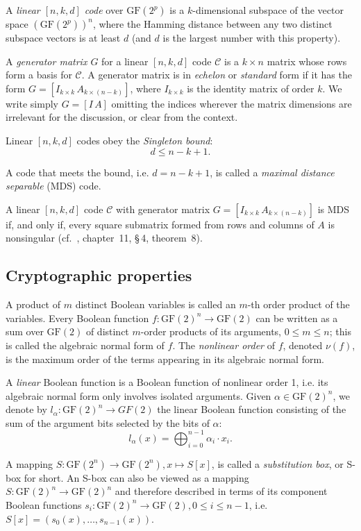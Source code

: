 \documentclass{llncs}
\newcommand{\GF}{\mathrm{GF}}
\begin{document}
A \emph{linear $[n, k, d]$ code} over $\GF(2^p)$ is a
$k$-dimensional subspace of the vector space $(\GF(2^p))^n$,
where the Hamming distance between any two distinct subspace
vectors is at least $d$ (and $d$ is the largest number with this
property).

A \emph{generator matrix $G$} for a linear $[n, k, d]$ code
$\mathcal{C}$ is a $k \times n$ matrix whose rows form a basis for
$\mathcal{C}$. A generator matrix is in \emph{echelon} or
\emph{standard} form if it has the form $G = [I_{k \times k} \,
A_{k \times (n-k)}]$, where $I_{k \times k}$ is the identity
matrix of order $k$. We write simply $G = [I \, A]$ omitting the
indices wherever the matrix dimensions are irrelevant for the
discussion, or clear from the context.

Linear $[n,k,d]$ codes obey the {\em Singleton bound}:
\[
d \leqslant n - k + 1.
\]

A code that meets the bound, i.e. $d = n - k + 1$, is called a
\emph{maximal distance separable} (MDS) code.

A linear $[n, k, d]$ code $\mathcal{C}$ with generator matrix $G
= [I_{k \times k} \, A_{k \times (n-k)}]$ is MDS if, and only if,
every square submatrix formed from rows and columns of $A$ is
nonsingular (cf.~\cite{macwilliams-sloane}, chapter~11, \S\,4,
theorem~8).

\subsection{Cryptographic properties}

A product of $m$ distinct Boolean variables is called an $m$-th
order product of the variables. Every Boolean function $f:
\GF(2)^n \rightarrow \GF(2)$ can be written as a sum over
$\GF(2)$ of distinct $m$-order products of its arguments, $0
\leqslant m \leqslant n$; this is called the algebraic normal
form of $f$. The \emph{nonlinear order} of $f$, denoted $\nu(f)$,
is the maximum order of the terms appearing in its algebraic
normal form.

A \emph{linear} Boolean function is a Boolean function of
nonlinear order 1, i.e. its algebraic normal form only involves
isolated arguments. Given $\alpha \in \GF(2)^n$, we denote by
$l_{\alpha}: \GF(2)^n \rightarrow GF(2)$ the linear Boolean
function consisting of the sum of the argument bits selected by
the bits of $\alpha$:
\[
l_{\alpha}(x) = \bigoplus_{i=0}^{n-1} \alpha_i \cdot x_i.
\]

A mapping $S: \GF(2^n) \rightarrow \GF(2^n), x \mapsto S[x]$, is
called a \emph{substitution box}, or S-box for short. An S-box
can also be viewed as a mapping $S: \GF(2)^n \rightarrow
\GF(2)^n$ and therefore described in terms of its component
Boolean functions $s_i: \GF(2)^n \rightarrow \GF(2), 0 \leqslant i
\leqslant n-1$, i.e. $S[x] = (s_0(x), \dots, s_{n-1}(x))$.
\end{document}
